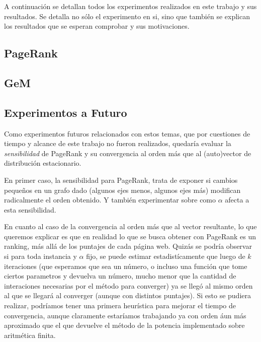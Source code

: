 \par A continuaci\'on se detallan todos los experimentos realizados en este
trabajo y sus resultados. Se detalla no s\'olo el experimento en si, sino que
tambi\'en se explican los resultados que se esperan comprobar y sus
motivaciones.

\subsection{PageRank}


\newpage


\newpage


\newpage


\newpage
\subsection{GeM}


\newpage


\newpage


\newpage


\newpage
\subsection*{Experimentos a Futuro}
\par Como experimentos futuros relacionados con estos temas, que por cuestiones
de tiempo y alcance de este trabajo no fueron realizados, quedaría evaluar la
\emph{sensibilidad} de PageRank y su convergencia al orden m\'as que al
(auto)vector de distribuci\'on estacionario.

\par En primer caso, la sensibilidad para PageRank, trata de exponer si cambios
peque\~nos en un grafo dado (algunos ejes menos, algunos ejes m\'as) modifican
radicalmente el orden obtenido. Y tambi\'en experimentar sobre como $\alpha$
afecta a esta sensibilidad.

\par En cuanto al caso de la convergencia al orden m\'as que al vector
resultante, lo que queremos explicar es que en realidad lo que se busca obtener
con PageRank es un ranking, m\'as all\'a de los puntajes de cada p\'agina web.
Quizás se podr\'ia observar si para toda instancia y $\alpha$ fijo, se puede
estimar estadist\'icamente que luego de $k$ iteraciones (que esperamos que sea
un n\'umero, o incluso una funci\'on que tome ciertos parametros y devuelva un
n\'umero, mucho menor que la cantidad de interaciones necesarias por el
m\'etodo para converger) ya se lleg\'o al mismo orden al que se llegar\'a al
converger (aunque con distintos puntajes). Si esto se pudiera realizar,
podr\'iamos tener una primera heur\'istica para mejorar el tiempo de
convergencia, aunque claramente estar\'iamos trabajando ya con orden \'aun m\'as
aproximado que el que devuelve el m\'etodo de la potencia implementado sobre
aritm\'etica finita.

